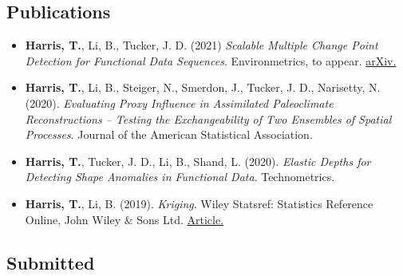 \documentclass[11pt]{article}
\begin{document}
\subsection*{Publications}
\vspace{-0.6cm}\noindent\hrulefill
\vspace{-0.2cm}

\begin{itemize}[leftmargin=*,label={}]
    \setlength\itemsep{0.5em}
    
    \item \textbf{Harris, T.}, Li, B., Tucker, J. D. (2021) \textit{Scalable Multiple Change Point Detection for Functional Data Sequences}. Environmetrics, to appear.  \href{https://arxiv.org/pdf/2008.01889}{\color{blue} {arXiv.}}
    
    \item \textbf{Harris, T.}, Li, B., Steiger, N., Smerdon, J., Tucker, J. D., Narisetty, N. (2020). \textit{Evaluating Proxy Influence in Assimilated Paleoclimate Reconstructions -- Testing the Exchangeability of Two Ensembles of Spatial Processes}. Journal of the American Statistical Association.
    \href{https://doi.org/10.1080/01621459.2020.1799810}{\color{blue}{Article.}}
    
    \item \textbf{Harris, T.}, Tucker, J. D., Li, B., Shand, L. (2020). \textit{Elastic Depths for Detecting Shape Anomalies in Functional Data}. Technometrics. 
    \href{https://doi.org/10.1080/00401706.2020.1811156}{\color{blue}{Article.}}
    
    \item \textbf{Harris, T.}, Li, B. (2019). \textit{Kriging}. Wiley Statsref: Statistics Reference Online, John Wiley \& Sons Ltd. \href{https://onlinelibrary.wiley.com/doi/pdf/10.1002/9781118445112.stat03708.pub2}{\color{blue} {Article.}}
\end{itemize}

\subsection*{Submitted}
\vspace{-0.6cm}\noindent\hrulefill
\vspace{-0.2cm}
\end{document}
